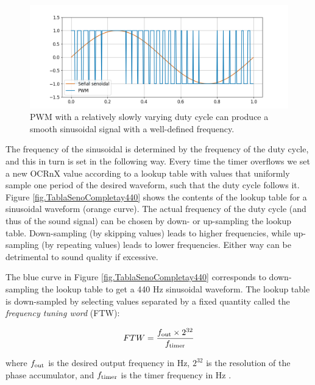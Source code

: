 \documentclass[twocolumn]{article}
\begin{document}
\begin{figure}[ht]
    \centering
    \includegraphics[width=\linewidth]{figures/EsquemaPWM.png}
    \caption{PWM with a relatively slowly varying duty cycle can produce a smooth sinusoidal signal with a well-defined frequency.}
    \label{fig.PWMsine}
\end{figure}


The frequency of the sinusoidal is determined by the frequency of the duty cycle, and this in turn is set in the following way. Every time the timer overflows we set a new OCRnX value according to a lookup table with values that uniformly sample one period of the desired waveform, such that the duty cycle follows it. Figure \ref{fig.TablaSenoCompletay440} shows the contents of the lookup table for a sinusoidal waveform (orange curve). The actual frequency of the duty cycle (and thus of the sound signal) can be chosen by down- or up-sampling the lookup table. Down-sampling (by skipping values) leads to higher frequencies, while up-sampling (by repeating values) leads to lower frequencies. Either way can be detrimental to sound quality if excessive.

The blue curve in Figure \ref{fig.TablaSenoCompletay440} corresponds to down-sampling the lookup table to get a 440 Hz sinusoidal waveform. The lookup table is down-sampled by selecting values separated by a fixed quantity called the {\em frequency tuning word} (FTW):

\begin{equation}
    FTW = \frac{f_{\mbox{\scriptsize out}} \times 2^{32}}{f_{\mbox{\scriptsize timer}}}
\end{equation}

\noindent where $f_{\mbox{\scriptsize out}}$ is the desired output frequency in Hz, $2^{32}$ is the resolution of the phase accumulator, and $f_{\mbox{\scriptsize timer}}$ is the timer frequency in Hz \cite{ftw}.
\end{document}
